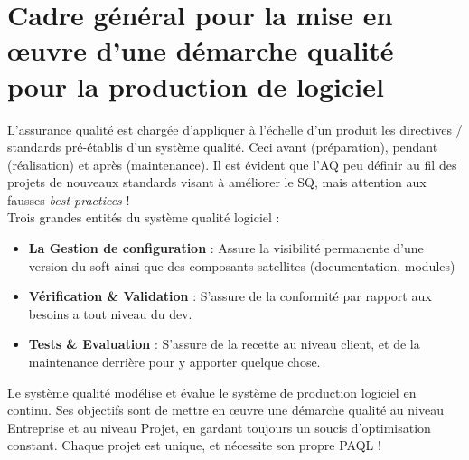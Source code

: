 
\section{Cadre général pour la mise en \oe{}uvre d’une démarche qualité pour la production de logiciel}


L’assurance qualité est chargée d’appliquer à l’échelle d’un produit les directives / standards pré-établis d’un système qualité. Ceci avant (préparation), pendant (réalisation) et après (maintenance).
Il est évident que l’AQ peu définir au fil des projets de nouveaux standards visant à améliorer le SQ, mais attention aux fausses \textsl{best practices} ! \\

Trois grandes entités du système qualité logiciel :\\
\begin{itemize}
\item \textbf{La Gestion de configuration} : Assure la visibilité permanente d’une version du soft ainsi que des composants satellites (documentation, modules)
\item \textbf{Vérification \& Validation}  : S’assure de la conformité par rapport aux besoins a tout niveau du dev.
\item \textbf{Tests \& Evaluation} :  S’assure de la recette au niveau client, et de la maintenance derrière pour y apporter quelque chose.
\end{itemize}


Le système qualité modélise et évalue le système de production logiciel en continu. 
Ses objectifs sont de mettre en \oe{}uvre une démarche qualité au niveau Entreprise et au niveau Projet, en gardant toujours un soucis d’optimisation constant.
Chaque projet est unique, et nécessite son propre PAQL !\\

